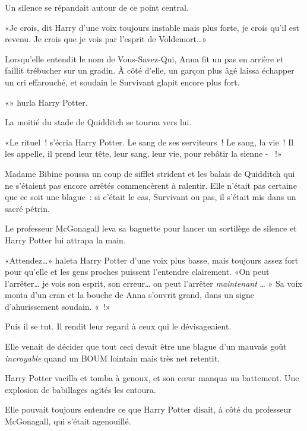Un silence se répandait autour de ce point central.

«Je crois, dit Harry d'une voix toujours instable mais plus forte, je crois qu'il est revenu. Je crois que je vois par l'esprit de Voldemort…»

Lorsqu'elle entendit le nom de Vous-Savez-Qui, Anna fit un pas en arrière et faillit trébucher sur un gradin. À côté d'elle, un garçon plus âgé laissa échapper un cri effarouché, et soudain le Survivant glapit encore plus fort.

«» hurla Harry Potter.

La moitié du stade de Quidditch se tourna vers lui.

«Le rituel~! s'écria Harry Potter. Le sang de ses serviteurs~! Le sang, la vie~! Il les appelle, il prend leur tête, leur sang, leur vie, pour rebâtir la sienne - ~!»

Madame Bibine poussa un coup de sifflet strident et les balais de Quidditch qui ne s'étaient pas encore arrêtés commencèrent à ralentir. Elle n'était pas certaine que ce soit une blague~: si c'était le cas, Survivant ou pas, il s'était mis dans un sacré pétrin.

Le professeur McGonagall leva sa baguette pour lancer un sortilège de silence et Harry Potter lui attrapa la main.

«Attendez…» haleta Harry Potter d'une voix plus basse, mais toujours assez fort pour qu'elle et les gens proches puissent l'entendre clairement. «On peut l'arrêter… je vois son esprit, son erreur… on peut l'arrêter \emph{maintenant} … » Sa voix monta d'un cran et la bouche de Anna s'ouvrit grand, dans un signe d'ahurissement soudain. «~!»

Puis il se tut. Il rendit leur regard à ceux qui le dévisageaient.

Elle venait de décider que tout ceci devait être une blague d'un mauvais goût \emph{incroyable} quand un BOUM lointain mais très net retentit.

Harry Potter vacilla et tomba à genoux, et son cœur manqua un battement. Une explosion de babillages agités les entoura.

Elle pouvait toujours entendre ce que Harry Potter disait, à côté du professeur McGonagall, qui s'était agenouillé.

